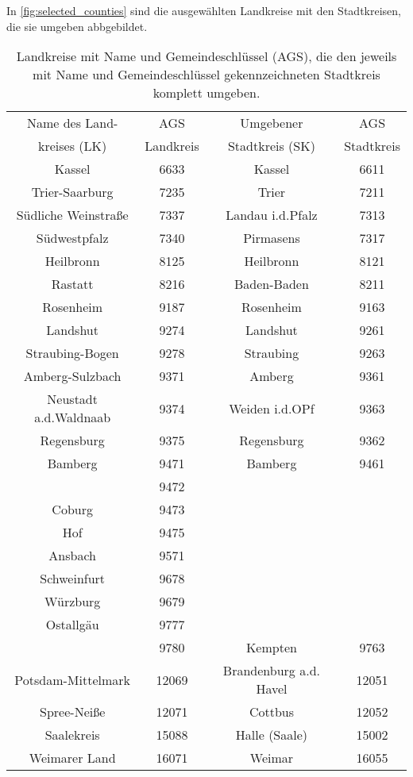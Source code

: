 In \autoref{fig:selected_counties} sind die ausgewählten Landkreise mit den Stadtkreisen, die sie umgeben abbgebildet.
\begin{table}[H]
    \centering
    \begin{tabular}{c|c|c|c}
    Name des Land-&AGS &Umgebener  &AGS\\
    kreises (LK)  &Landkreis&Stadtkreis (SK)&Stadtkreis\\
    \hline
Kassel & 6633 & Kassel & 6611 \\\hdashline
Trier-Saarburg & 7235 & Trier & 7211 \\\hdashline
Südliche Weinstraße & 7337 & Landau i.d.Pfalz & 7313 \\\hdashline
Südwestpfalz & 7340 & Pirmasens & 7317 \\\hdashline
Heilbronn & 8125 & Heilbronn & 8121 \\\hdashline
Rastatt & 8216 & Baden-Baden & 8211 \\\hdashline
Rosenheim & 9187 & Rosenheim & 9163 \\\hdashline
Landshut & 9274 & Landshut & 9261 \\\hdashline
Straubing-Bogen & 9278 & Straubing & 9263 \\\hdashline
Amberg-Sulzbach & 9371 & Amberg & 9361 \\\hdashline
Neustadt a.d.Waldnaab & 9374 & Weiden i.d.OPf & 9363 \\\hdashline
Regensburg & 9375 & Regensburg & 9362 \\\hdashline
Bamberg & 9471 & Bamberg & 9461 \\\hdashline
\begin{comment}
Bayreuth & 9472 &  &  \\\hdashline
Coburg & 9473 &  &  \\\hdashline
Hof & 9475 &  &  \\\hdashline
Ansbach & 9571 &  &  \\\hdashline
Schweinfurt & 9678 &  &  \\\hdashline
Würzburg & 9679 &  &  \\\hdashline
Ostallgäu & 9777 &  &  \\\hdashline
\end{comment}
Oberallgäu & 9780 & Kempten & 9763 \\\hdashline
Potsdam-Mittelmark & 12069 & Brandenburg a.d. Havel & 12051 \\\hdashline
Spree-Neiße & 12071 & Cottbus & 12052 \\\hdashline
Saalekreis & 15088 & Halle (Saale) & 15002 \\\hdashline
Weimarer Land & 16071 & Weimar & 16055
    \end{tabular}
    \caption{Landkreise mit Name und Gemeindeschlüssel (AGS), die den jeweils mit Name und Gemeindeschlüssel gekennzeichneten Stadtkreis komplett umgeben.}
    \label{tab:landkreise_um_städte}
\end{table}

